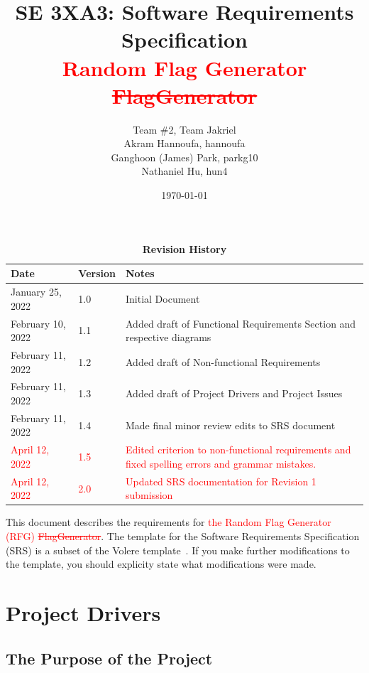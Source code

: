 \documentclass[12pt, titlepage]{article}
\title{SE 3XA3: Software Requirements Specification\\\textcolor{red}{Random Flag Generator \sout{FlagGenerator}}}
\author{Team \#2, Team Jakriel
        \\ Akram Hannoufa, hannoufa
        \\ Ganghoon (James) Park, parkg10
        \\ Nathaniel Hu, hun4
}
\date{\today}
\begin{document}
\maketitle

\tableofcontents
\listoftables
\listoffigures

\newpage 
\begin{table}[h!]
\caption{\bf Revision History}
\begin{tabularx}{\textwidth}{p{3cm}p{2cm}X}
\toprule {\bf Date} & {\bf Version} & {\bf Notes}\\
\midrule
January 25, 2022 & 1.0 & Initial Document\\
February 10, 2022 & 1.1 & Added draft of Functional Requirements Section and respective diagrams\\
February 11, 2022 & 1.2 & Added draft of Non-functional Requirements\\
February 11, 2022 & 1.3 & Added draft of Project Drivers and Project Issues\\
February 11, 2022 & 1.4 & Made final minor review edits to SRS document\\
\textcolor{red}{April 12, 2022} & \textcolor{red}{1.5} & \textcolor{red}{Edited criterion to non-functional requirements and fixed spelling errors and grammar mistakes.}\\
\textcolor{red}{April 12, 2022} & \textcolor{red}{2.0} & \textcolor{red}{Updated SRS documentation for Revision 1 submission}\\
\bottomrule
\end{tabularx}
\end{table}

\newpage


\noindent This document describes the requirements for \textcolor{red}{the
Random Flag Generator (RFG) \sout{FlagGenerator}}. The template for the
Software Requirements Specification (SRS) is a subset of the Volere
template~\citep{RobertsonAndRobertson2012}.  If you make further modifications
to the template, you should explicity state what modifications were made.

\section{Project Drivers}

\subsection{The Purpose of the Project}
\end{document}
